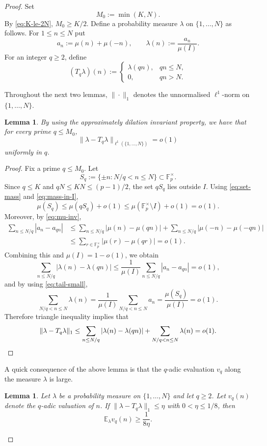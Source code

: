 \documentclass[11pt,letterpaper,reqno]{amsart}
\newtheorem{lemma}[theorem]{Lemma}
\theoremstyle{definition}
\newcommand{\F}{\mathbb F}
\newcommand{\E}{\mathbb E}
\newcommand{\1}{\mathbf 1}
\begin{document}
\begin{proof}
Set
\[
        M_0:=\min(K,N).
\]
By \eqref{eq:K-le-2N}, $M_0\ge K/2$.  Define a probability measure $\lambda$ on
$\{1,\dots,N\}$ as follows.  For $1\le n\le N$ put
\[
        a_n:=\mu(n)+\mu(-n),
        \qquad
        \lambda(n):=\frac{a_n}{\mu(I)}.
\]
For an integer $q\ge2$, define
\[
    (T_q\lambda)(n):=
    \begin{cases}
        \lambda(qn),& qn\le N,\\
        0,& qn>N.
    \end{cases}
\]

Throughout the next two lemmas, $\|\cdot\|_1$ denotes the unnormalised
$\ell^1$-norm on $\{1,\dots,N\}$.

\begin{lemma}\label{lem:Tq}
By using the approximately dilation invariant property, we have that 
for every prime $q\le M_0$,
\[
        \|\lambda-T_q\lambda\|_{\ell^1(\{1,\dots,N\})}=o(1)
\]
uniformly in $q$.
\end{lemma}

\begin{proof}
Fix a prime $q\le M_0$.  Let
\[
        S_q:=\{\pm n: N/q<n\le N\}\subset\F_p^\times.
\]
Since $q\le K$ and $qN\le KN\le(p-1)/2$, the set $qS_q$ lies outside $I$.
Using \eqref{eq:set-mass} and \eqref{eq:mass-in-I},
\[
        \mu(S_q)\le \mu(qS_q)+o(1)
        \le \mu(\F_p^\times\setminus I)+o(1)=o(1).        \tag{2.5}\label{eq:tail-small}
\]
Moreover, by \eqref{eq:mu-inv},
\[
\begin{aligned}
    \sum_{n\le N/q}|a_n-a_{qn}|
    &\le \sum_{n\le N/q}|\mu(n)-\mu(qn)|
        +\sum_{n\le N/q}|\mu(-n)-\mu(-qn)|  \\
    &\le \sum_{r\in\F_p^\times}|\mu(r)-\mu(qr)|=o(1).
\end{aligned}
\]
Combining this and \(\mu(I)=1-o(1)\), we obtain
\[
    \sum_{n\le N/q}|\lambda(n)-\lambda(qn)|
    \le \frac{1}{\mu(I)}\sum_{n\le N/q}|a_n-a_{qn}|=o(1),
\]
and by using \eqref{eq:tail-small},
\[   \sum_{N/q<n\le N}\lambda(n)
    =\frac{1}{\mu(I)}\sum_{N/q<n\le N}a_n
    =\frac{\mu(S_q)}{\mu(I)}
    =o(1).
\]
Therefore triangle inequality implies that 
\[
    \|\lambda-T_q\lambda\|_1
  \le \sum_{n\le N/q}|\lambda(n)-\lambda(qn)|+
      \sum_{N/q<n\le N}\lambda(n) 
 =o(1).
\qedhere\]
\end{proof}

A quick consequence of the above lemma is that the $q$-adic evaluation $v_q$ along the measure $\lambda$ is large. 
\begin{lemma}\label{lem:vq}
Let $\lambda$ be a probability measure on $\{1,\dots,N\}$ and let $q\ge2$. Let $v_q(n)$ denote the $q$-adic valuation of $n$. If
$\|\lambda-T_q\lambda\|_1\le \eta$ with $0<\eta\le1/8$, then
\[
        \E_\lambda v_q(n)\ge \frac{1}{8\eta}.
\]
\end{lemma}


\end{proof}
\end{document}

